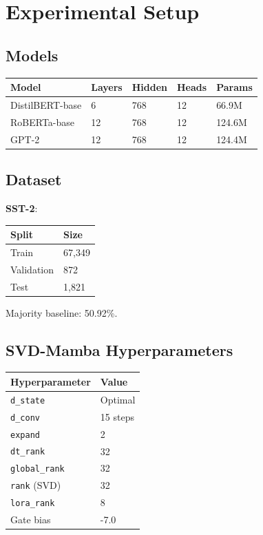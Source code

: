 
\section{Experimental Setup}

\subsection{Models}

\begin{table}[H]
\centering
\small
\begin{tabular}{lllll}
\toprule
\textbf{Model} & \textbf{Layers} & \textbf{Hidden} & \textbf{Heads} & \textbf{Params} \\
\midrule
DistilBERT-base & 6 & 768 & 12 & 66.9M \\
RoBERTa-base & 12 & 768 & 12 & 124.6M \\
GPT-2 & 12 & 768 & 12 & 124.4M \\
\bottomrule
\end{tabular}
\end{table}

\subsection{Dataset}

\textbf{SST-2}:

\begin{table}[H]
\centering
\small
\begin{tabular}{ll}
\toprule
\textbf{Split} & \textbf{Size} \\
\midrule
Train & 67,349 \\
Validation & 872 \\
Test & 1,821 \\
\bottomrule
\end{tabular}
\end{table}

Majority baseline: 50.92\%.

\subsection{SVD-Mamba Hyperparameters}

\begin{table}[H]
\centering
\small
\begin{tabular}{ll}
\toprule
\textbf{Hyperparameter} & \textbf{Value} \\
\midrule
\texttt{d\_state} & Optimal \\
\texttt{d\_conv} & 15 steps \\
\texttt{expand} & 2 \\
\texttt{dt\_rank} & 32 \\
\texttt{global\_rank} & 32 \\
\texttt{rank} (SVD) & 32 \\
\texttt{lora\_rank} & 8 \\
Gate bias & -7.0 \\
\bottomrule
\end{tabular}
\end{table}


